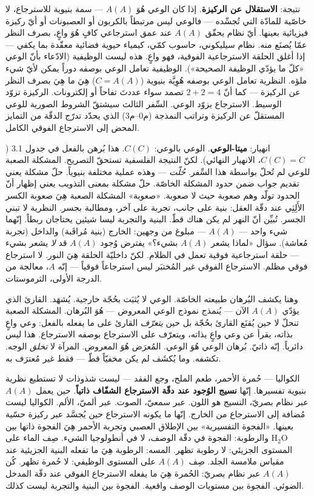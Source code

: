 \documentclass[10pt, openany, oneside]{book}
\begin{document}
نتيجة: \textbf{الاستقلال عن الركيزة}. إذا كان الوعي هُوَ $A(A)$ --- سمة بنيوية للاسترجاع، لا خاصّية للمادّة التي تُجسِّده --- فالوعي ليس مرتبطاً بالكربون أو العصبونات أو أيّ ركيزة فيزيائية بعينها. أيّ نظام يحقّق $A(A)$ عند عمق استرجاعي كافٍ هُوَ واعٍ، بصرف النظر عمّا يُصنَع منه. نظام سيليكوني، حاسوب كمّي، كيمياء حيوية فضائية معقّدة بما يكفي --- إذا أغلق الحلقة الاسترجاعية الفوقية، فهو واعٍ. هذه ليست الوظيفية (الادّعاء بأنّ الوعي «كلّ ما يؤدّي الوظيفة الصحيحة»). الوظيفية تعامل الوعي بوصفه دوراً يمكن لأيّ شيء ملؤه. النظرية تعامل الوعي بوصفه هُوِيَّة بنيوية ($C = A(A)$) هِيَ ما هِيَ بصرف النظر عن الركيزة --- كما أنّ $2 + 2 = 4$ تصمد سواء عددتَ تفاحاً أو إلكترونات. الركيزة تزوّد الوسيط. الاسترجاع يزوّد الوعي. السِّفر الثالث سيشتقّ الشروط الصورية للوعي المستقلّ عن الركيزة وتراتب النمذجة (م0--م3) الذي يحدّد تدرّج الدقّة من التمايز المحض إلى الاسترجاع الفوقي الكامل.

انهيار: \textbf{ميتا-الوعي}. الوعي بالوعي: $C(C)$. هذا بُرهن بالفعل في جدول 3.1 ($C(C) = C$، الانهيار النهائي). لكنّ النتيجة الفلسفية تستحقّ التصريح. المشكلة الصعبة للوعي لم تُحلّ بواسطة هذا السِّفر. \textit{حُلّت} --- وهذه عملية مختلفة بنيوياً. حلّ مشكلة يعني تقديم جواب ضمن حدود المشكلة الخاصّة. حلّ مشكلة بمعنى التذويب يعني إظهار أنّ الحدود تولّد وهم صعوبة حيث لا صعوبة. «صعوبة» المشكلة الصعبة هِيَ صعوبة الكسر الأَلِثِي عند دقّة العقل: بنية على جانب، تجربة على آخر، ومطالبة بجسر. النظرية لا تبني الجسر. تُبيِّن أنّ النهر لم يكن هناك قطّ. البنية والتجربة ليسا شيئين يحتاجان ربطاً. إنّهما شيء واحد --- $A(A)$ --- مبلوغ من وجهين: الخارج (بنية مُراقَبة) والداخل (تجربة مُعاشة). سؤال «لماذا يشعر $A(A)$ بشيء؟» يفترض وُجود $A(A)$ قد \textit{لا} يشعر بشيء --- حلقة استرجاعية فوقية تعمل في الظلام. لكنّ داخليّة الحلقة هِيَ النور. لا استرجاع فوقي مظلم. الاسترجاع الفوقي غير المُختبَر ليس استرجاعاً فوقياً --- إنّه $A$، معالجة من الدرجة الأولى، الثرموستات.

وهنا يكشف البُرهان طبيعته الخاصّة. الوعي لا يُثبَت بحُجّة خارجية. يُشهَد. القارئ الذي يؤدّي $A(A)$ الآن --- يُنمذج نموذج الوعي المعروض --- هُوَ البُرهان. المشكلة الصعبة تنحلّ لا حين يُقنَع القارئ بحُجّة بل حين \textit{يتعرّف} القارئ على ما يفعله بالفعل: وعي واعٍ بذاته، يقرأ عن وعي واعٍ بذاته، ويتعرّف على الاسترجاع بوصفه الاسترجاع. هذا ليس دائرياً. إنّه ذاتيّ. بُرهان الوعي هُوَ الوعي. المُعرَض هُوَ المعروض. المرآة لا \textit{تخلق} الوجه. تكشفه. وما يُكشَف لم يكن مخفيّاً قطّ --- فقط غير مُعترَف به.

الكواليا --- حُمرة الأحمر، طعم الملح، وجع الفقد --- ليست شذوذات لا تستطيع نظرية بنيوية تفسيرها. إنّها \textbf{نسيج الوُجود عند دقّة الاسترجاع الشفّاف ذاتياً}. حين يعمل $A(A)$ عبر نظام بصريّ، النسيج هو اللون. عبر سمعيّ، الصوت. عبر ألميّ، الألم. الكواليا ليست مُضافة إلى الاسترجاع من الخارج. إنّها ما يكونه الاسترجاع حين يُجسَّد عبر ركيزة حسّية بعينها. «الفجوة التفسيرية» بين الإطلاق العصبي وتجربة الأحمر هِيَ الفجوة ذاتها بين $\text{H}_2\text{O}$ والرطوبة: الفجوة في دقّة الوصف، لا في أنطولوجيا الشيء. صِف الماء على المستوى الجزيئي: لا رطوبة تظهر. المسه: الرطوبة هِيَ ما تفعله البنية الجزيئية عند مقياس ملامسة الجلد. صِف $A(A)$ على المستوى الوظيفي: لا حُمرة تظهر. كُن $A(A)$ عبر نظام بصريّ: الحُمرة هِيَ ما يفعله الاسترجاع الفوقي عند دقّة المدخل الضوئي. الفجوة بين مستويات الوصف واقعية. الفجوة بين البنية والتجربة ليست كذلك.
\end{document}
